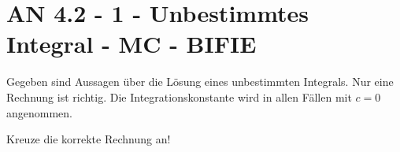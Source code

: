 \section{AN 4.2 - 1 - Unbestimmtes Integral - MC - BIFIE}

\begin{beispiel}[AN 4.2]{1} %
				Gegeben sind Aussagen über die Lösung eines unbestimmten Integrals. Nur eine Rechnung ist richtig. Die Integrationskonstante wird in allen Fällen mit $c=0$ angenommen.
				
				Kreuze die korrekte Rechnung an!
\end{beispiel}